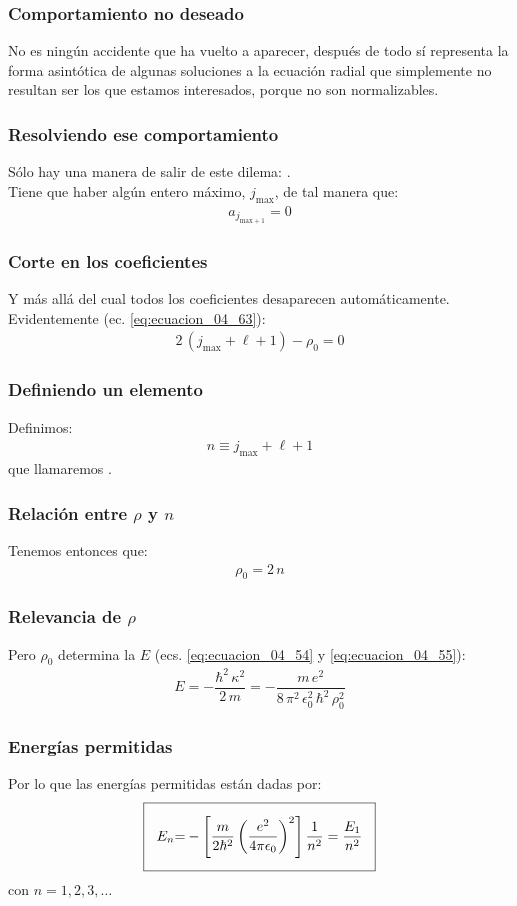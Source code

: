 \documentclass[12pt]{beamer}
\begin{document}
\begin{frame}
\frametitle{Comportamiento no deseado}
No es ningún accidente que ha vuelto a aparecer, después de todo sí representa la forma asintótica de algunas soluciones a la ecuación radial que simplemente no resultan ser los que estamos interesados, porque no son normalizables.
\end{frame}
\begin{frame}
\frametitle{Resolviendo ese comportamiento}
Sólo hay una manera de salir de este dilema: \pause {}.
\\
\bigskip
\pause
Tiene que haber algún entero máximo, $j_{\text{max}}$, de tal manera que:
\pause
\begin{align}
a_{j_{\text{max} + 1}} = 0
\label{eq:ecuacion_04_66}
\end{align}
\end{frame}
\begin{frame}
\frametitle{Corte en los coeficientes}
Y más allá del cual todos los coeficientes desaparecen automáticamente. Evidentemente (ec. \ref{eq:ecuacion_04_63}):
\pause
\begin{align*}
2 \, (j_{\text{max}} + \ell + 1) - \rho_{0} = 0
\end{align*}
\end{frame}
\begin{frame}
\frametitle{Definiendo un elemento}
Definimos:
\begin{align}
n \equiv j_{\text{max}} + \ell + 1
\label{eq:ecuacion_04_67}
\end{align}
que llamaremos .
\end{frame}
\begin{frame}
\frametitle{Relación entre $\rho$ y $n$}
Tenemos entonces que:
\pause
\begin{align}
\rho_{0} = 2 \, n
\label{eq:ecuacion_04_68}
\end{align}
\end{frame}
\begin{frame}
\frametitle{Relevancia de $\rho$}
Pero $\rho_{0}$ determina la $E$ (ecs. \ref{eq:ecuacion_04_54} y \ref{eq:ecuacion_04_55}):
\pause
\begin{align}
E = - \dfrac{\hbar^{2} \, \kappa^{2}}{2 \, m} = - \dfrac{m \, e^{2}}{8 \, \pi^{2} \, \epsilon_{0}^{2} \, \hbar^{2} \, \rho_{0}^{2}}
\label{eq:ecuacion_04_69}
\end{align}
\end{frame}
\begin{frame}
\frametitle{Energías permitidas}
Por lo que las energías permitidas están dadas por:
\pause
\begin{align}
\setlength{\fboxsep}{3\fboxsep}\boxed{
E_{n} {=} - \left[ \dfrac{m}{2 \hbar^{2}} \left( \dfrac{e^{2}}{4 \pi \epsilon_{0}} \right)^{2} \right] \dfrac{1}{n^{2}} = \dfrac{E_{1}}{n^{2}}}
\label{eq:ecuacion_04_70}
\end{align}
con $n = 1, 2, 3, \ldots$
\end{frame}
\end{document}

